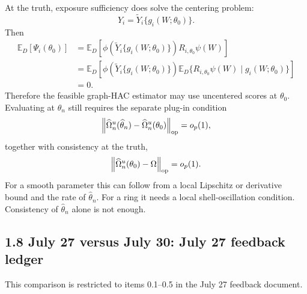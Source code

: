 \documentclass[11pt]{article}
\newcommand{\E}{\mathbb{E}}
\begin{document}
At the truth, exposure sufficiency does solve the centering problem:
\[
    Y_i=\widetilde Y_i\{g_i(W;\theta_0)\}.
\]
Then
\begin{align*}
    \E_D[\Psi_i(\theta_0)]
    &=
    \E_D\!\left[
       \phi\!\left(\widetilde Y_i\{g_i(W;\theta_0)\}\right)
       R_{i,\theta_0}\psi(W)
    \right]\\
    &=
    \E_D\!\left[
       \phi\!\left(\widetilde Y_i\{g_i(W;\theta_0)\}\right)
       \E_D\{R_{i,\theta_0}\psi(W)\mid g_i(W;\theta_0)\}
    \right]\\
    &=0.
\end{align*}
Therefore the feasible graph-HAC estimator may use uncentered scores at
\(\theta_0\). Evaluating at \(\widehat\theta_n\) still requires the separate
plug-in condition
\[
    \left\|
       \widehat\Omega_n^u(\widehat\theta_n)
       -
       \widehat\Omega_n^u(\theta_0)
    \right\|_{\rm op}
    =
    o_p(1),
\]
together with consistency at the truth,
\[
    \left\|
       \widehat\Omega_n^u(\theta_0)-\Omega
    \right\|_{\rm op}
    =
    o_p(1).
\]
For a smooth parameter this can follow from a local Lipschitz or derivative
bound and the rate of \(\widehat\theta_n\). For a ring it needs a local
shell-oscillation condition. Consistency of \(\widehat\theta_n\) alone is not
enough.

\subsection*{1.8 July 27 versus July 30: July 27 feedback ledger}

This comparison is restricted to items 0.1--0.5 in the July 27 feedback
document.
\end{document}
